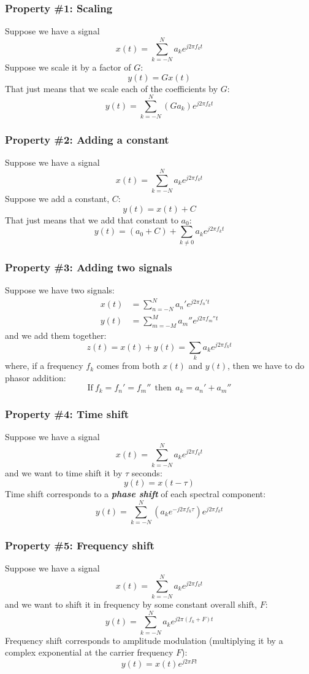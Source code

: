 \documentclass{beamer}
\begin{document}
\begin{frame}
  \frametitle{Property \#1: Scaling}

  Suppose we have a signal
  \[
  x(t) = \sum_{k=-N}^N a_ke^{j2\pi f_kt}
  \]
  Suppose we scale it by a factor of $G$:
  \[
  y(t) = Gx(t)
  \]
  That just means that we scale each of the coefficients by $G$:
  \[
  y(t)  = \sum_{k=-N}^N \left(Ga_k\right) e^{j2\pi f_kt}
  \]
\end{frame}

\begin{frame}
  \frametitle{Property \#2: Adding a constant}

  Suppose we have a signal
  \[
  x(t) = \sum_{k=-N}^N a_ke^{j2\pi f_kt}
  \]
  Suppose we add a constant, $C$:
  \[
  y(t) = x(t) + C
  \]
  That just means that we add that constant to $a_0$:
  \[
  y(t)  = (a_0+C) + \sum_{k\ne 0} a_k e^{j2\pi f_kt}
  \]
\end{frame}

\begin{frame}
  \frametitle{Property \#3: Adding two signals}

  Suppose we have two signals:
  \begin{align*}
    x(t) &= \sum_{n=-N}^N a_n'e^{j2\pi f_n't}\\
    y(t) &= \sum_{m=-M}^M a_m''e^{j2\pi f_m''t}
  \end{align*}
  and we add them together:
  \[
  z(t) = x(t) + y(t) = \sum_k a_ke^{j2\pi f_kt}
  \]
  where, if a frequency $f_k$ comes from both $x(t)$ and $y(t)$, then
  we have to do phasor addition:
  \[
  \mbox{If}~f_k=f_n'=f_m''~~\mbox{then}~~a_k=a_n'+a_m''
  \]
\end{frame}

\begin{frame}
  \frametitle{Property \#4: Time shift}

  Suppose we have a signal
  \[
  x(t) = \sum_{k=-N}^N a_ke^{j2\pi f_kt}
  \]
  and we want to time shift it by $\tau$ seconds:
  \[
  y(t) = x(t-\tau)
  \]
  Time shift corresponds to a {\em\bf phase shift} of each spectral component:
  \[
  y(t) = \sum_{k=-N}^N \left(a_ke^{-j2\pi f_k\tau}\right)e^{j2\pi f_kt}
  \]
\end{frame}

\begin{frame}
  \frametitle{Property \#5: Frequency shift}

  Suppose we have a signal
  \[
  x(t) = \sum_{k=-N}^N a_ke^{j2\pi f_kt}
  \]
  and we want to shift it in frequency by some constant overall shift, $F$:
  \[
  y(t) = \sum_{k=-N}^N a_ke^{j2\pi \left(f_k+F\right)t}
  \]
  Frequency shift corresponds to amplitude modulation (multiplying it by a
  complex exponential at the carrier frequency $F$):
  \[
  y(t) = x(t) e^{j2\pi Ft}
  \]
\end{frame}
\end{document}
